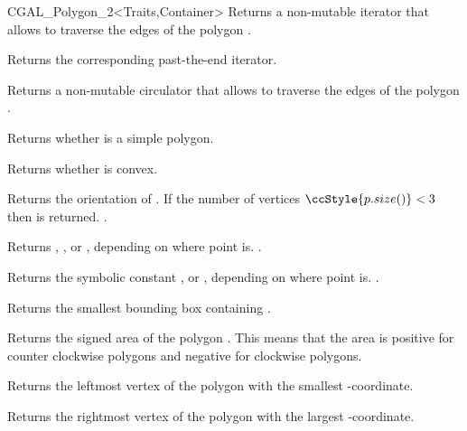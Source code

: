 \begin{ccClassTemplate}{CGAL_Polygon_2<Traits,Container>}
    { Returns a non-mutable iterator that allows to traverse the edges of
      the polygon .}

    { Returns the corresponding past-the-end iterator. }

    { Returns a non-mutable circulator that allows to traverse the edges of
      the polygon .}


    { Returns whether  is a simple polygon.}

    { Returns whether  is convex. }

    { Returns the orientation of \ccVar. If the number of vertices 
      $\ccStyle{p.size()} < 3$ then  is returned.
      \ccPrecond {}.
    }

    { Returns , ,
       or , 
       depending on where point  is.
      \ccPrecond {}.
    }

    { Returns the symbolic constant , 
      or , depending on where point
       is.
      \ccPrecond {}.
    }

    { Returns the smallest bounding box containing \ccVar.}
    
    { Returns the signed area of the polygon \ccVar. This means that the area is
      positive for counter clockwise polygons and negative for clockwise polygons.
    }
      
    { Returns the leftmost vertex of the polygon  with the smallest
     -coordinate. }
    
    { Returns the rightmost vertex of the polygon  with the largest
     -coordinate. }
    

\end{ccClassTemplate}
